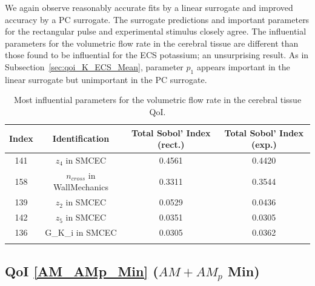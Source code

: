 We again observe reasonably accurate fits by a linear surrogate and improved accuracy by a PC surrogate. The surrogate predictions and important parameters for the rectangular pulse and experimental stimulus closely agree. The influential parameters for the volumetric flow rate in the cerebral tissue are different than those found to be influential for the ECS potassium; an unsurprising result. As in Subsection~\ref{sec:qoi_K_ECS_Mean}, parameter $p_1$ appears important in the linear surrogate but unimportant in the PC surrogate.

\begin{table}[h]
\centering
{}
\begin{tabular}{cccc}
\toprule
Index & Identification & Total Sobol' Index (rect.) & Total Sobol' Index (exp.)\\
\midrule
141 &  $z_4$ in SMCEC & 0.4561 & 0.4420\\
158 & $n_{cross}$ in WallMechanics & 0.3311 & 0.3544\\ 
 139 & $z_2$ in SMCEC & 0.0529 & 0.0436\\
 142 & $z_5$ in SMCEC &  0.0351 &0.0305\\
  136 & G\_K\_i in SMCEC & 0.0305 &0.0362\\
   \arrayrulecolor{black}\bottomrule
\end{tabular}
\caption{Most influential parameters for the volumetric flow rate in the cerebral tissue QoI.}
\label{tab:qoi_vol_flow}
\end{table}

\subsection{QoI \eqref{AM_AMp_Min} ($AM+AM_p$ Min)}


